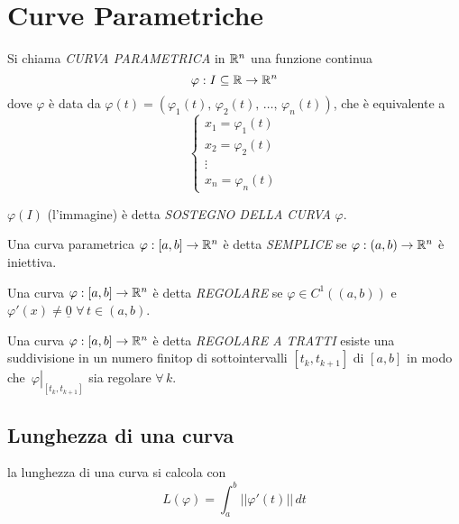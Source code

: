 \section{Curve Parametriche}

\begin{definition}
    Si chiama \emph{CURVA PARAMETRICA} in $\mathbb{R}^n$ una funzione continua 
    \begin{equation}
        \varphi : I \subseteq \mathbb{R} \to \mathbb{R}^n
    \end{equation}
    dove $\varphi$ è data da $\varphi(t) = (\varphi_1(t),\, \varphi_2(t),\, \dotsc,\, \varphi_n(t))$, che è equivalente a 
    \[
        \begin{cases}
            x_1 = \varphi_1(t) \\
            x_2 = \varphi_2(t) \\
            \vdots \\
            x_n = \varphi_n(t)
        \end{cases}
    \]
\end{definition}


$\varphi(I)$ (l'immagine) è detta \emph{SOSTEGNO DELLA CURVA} $\varphi$.

\begin{definition}
    Una curva parametrica $\varphi:[a,b] \to \mathbb{R}^n$ è detta \emph{SEMPLICE} se $\varphi:(a,b) \to \mathbb{R}^n$ è iniettiva.
\end{definition}

\begin{definition}
    Una curva $\varphi:[a,b] \to \mathbb{R}^n$ è detta \emph{REGOLARE} se $\varphi \in C^1((a,b))$ e $\varphi'(x) \neq \underline{0}$ $\forall\, t \in (a, b)$.
\end{definition}

\begin{definition}
    Una curva $\varphi:[a,b] \to \mathbb{R}^n$ è detta \emph{REGOLARE A TRATTI} esiste una suddivisione in un numero finitop di sottointervalli $[t_k, t_{k+1}]$ di $[a,b]$ in modo che$\left.\phantom{\frac{1}{1}}\varphi\right|_{[t_k, t_{k+1}]}$ sia regolare $\forall \, k$.
\end{definition}

\subsection{Lunghezza di una curva}
la lunghezza di una curva si calcola con
\begin{equation}
    L(\varphi) = \int_a^b || \varphi' (t) || \, dt
\end{equation}

